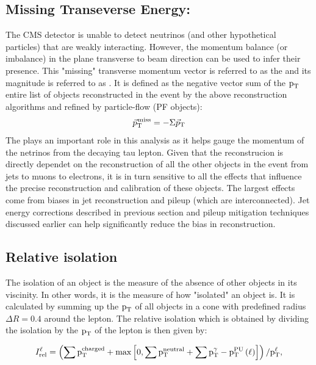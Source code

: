 \subsection{Missing Transeverse Energy: \ptvecmiss} 
\label{mt_met_recon}
The CMS detector is unable to detect neutrinos (and other hypothetical particles) that are weakly interacting. However, the momentum balance (or imbalance) in the plane transverse to beam direction can be used to infer their presence. This "missing" transverse momentum vector is referred to as the \ptvecmiss and its magnitude is referred to as \ptmiss. It is defined as the negative vector sum of the $\text{p}_\text{T}$ entire list of objects reconstructed in the event by the above reconstruction algorithms and refined by particle-flow (PF objects):
\begin{equation}
  {\vec p}_{\mathrm{T}}^{\kern1pt\text{miss}}=-\Sigma{\vec p}_{\mathrm{T}}
\end{equation}
The \ptvecmiss plays an important role in this analysis as it helps gauge the momentum of the netrinos from the decaying tau lepton. Given that the \ptvecmiss reconstrucion is directly dependet on the reconstruction of all the other objects in the event from jets to muons to electrons, it is in turn sensitive to all the effects that influence the precise reconstruction and calibration of these objects. The largest effects come from biases in jet reconstruction and pileup (which are interconnected). Jet energy corrections described in previous section and pileup mitigation techniques discussed earlier can help significantly reduce the bias in \ptvecmiss reconstruction. 


\subsection{Relative isolation}

The isolation of an object is the measure of the absence of other objects in its viscinity. In other words, it is the measure of how "isolated" an object is. It is calculated by summing up the $\text{p}_\text{T}$ of all objects in a cone with predefined radius $\Delta R=0.4$ around the lepton. The relative isolation which is obtained by dividing the isolation by the $\text{p}_\text{T}$ of the lepton is then given by:

\begin{equation}
I_\text{rel}^{\ell} = \left( \sum  \text{p}_\text{T}^\text{charged} + \text{max}\left[ 0, \sum \text{p}_\text{T}^\text{neutral}
                                 +  \sum \text{p}_\text{T}^{\gamma} - \text{p}_\text{T}^\text{PU}\left(\ell\right)  \right] \right) /  \text{p}_\text{T}^{\ell},
\end{equation}

